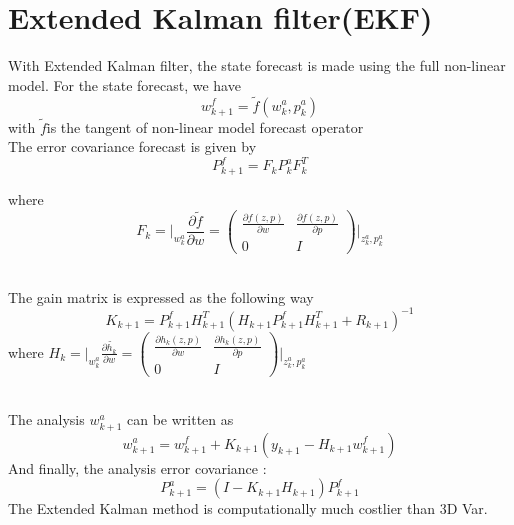 \documentclass[a4,12pt]{article}
\numberwithin{equation}{section}
\begin{document}
\section{Extended Kalman filter(EKF)}  
With Extended Kalman filter, the state forecast is made using the full non-linear model.
For the state forecast, we have 
\begin{equation}
w_{k+1}^f = \tilde{f} (w_k^a, p_k^a)
\label{EKFfor}
\end{equation}
with $\tilde{f} $is the tangent of non-linear model forecast operator 
~~\\
The error covariance forecast is given by 
\begin{equation}
P_{k+1}^f = F_k P_k^a F_k^T
\label{CovEKF}
\end{equation}

where 
\begin{equation}
F_k = \big|_{w_k^a} \frac{\partial \tilde{f} }{ \partial w } = 
\begin{pmatrix}
\frac{\partial f(z,p)}{\partial w } & \frac{\partial f(z,p)}{ \partial p}\\
0 & I 
\end{pmatrix}  \big|_{{z_k^a},{ p_k^a}}
\label{EKFF}
\end{equation}

~~\\
The gain matrix is expressed as the following way
\begin{equation}
K_{k+1} = P_{k+1}^f H_{k+1}^T (H_{k+1} P_{k+1}^f H_{k+1}^T + R_{k+1}) ^{-1}
\end{equation}
where  $H_k = \big|_{w_k^a} \frac{\partial \tilde{h_k} }{ \partial w } = 
\begin{pmatrix}
\frac{\partial h_k(z,p)}{\partial w } & \frac{\partial h_k(z,p)}{ \partial p}\\
0 & I 
\end{pmatrix}  \big|_{{z_k^a},{ p_k^a}}$

~~\\
The analysis $w_{k+1}^a$ can be written as 
\begin{equation}
    w_{k+1}^a = w_{k+1}^f + K_{k+1} (y_{k+1} - H_{k+1} w_{k+1}^f)
\end{equation}
And finally, the analysis error covariance :
\begin{equation}
    P_{k+1}^a = (I - K_{k+1} H_{k+1} ) P_{k+1}^f
\end{equation}
The Extended Kalman method is computationally much costlier than 3D Var.  

\end{document}
